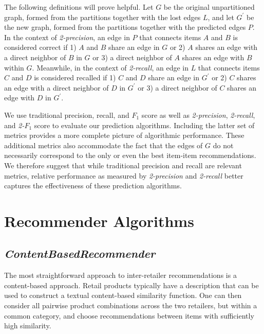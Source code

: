 \documentclass[11pt]{article}
\begin{document}
The following definitions will prove helpful. Let $G$ be the original
unpartitioned graph, formed from the partitions together with the lost edges
$L$, and let $G^{\prime}$ be the new graph, formed from the partitions together
with the predicted edges $P$.  In the context of {\em 2-precision}, an edge in
$P$ that connects items $A$ and $B$ is considered correct if 1) $A$ and $B$
share an edge in $G$ or 2) $A$ shares an edge with a direct neighbor of $B$ in
$G$ or 3) a direct neighbor of $A$ shares an edge with $B$ within $G$.
Meanwhile, in the context of {\em 2-recall}, an edge in $L$ that connects items
$C$ and $D$ is considered recalled if 1) $C$ and $D$ share an edge in
$G^{\prime}$ or 2) $C$ shares an edge with a direct neighbor of $D$ in
$G^{\prime}$ or 3) a direct neighbor of $C$ shares an edge with $D$ in
$G^{\prime}$.

We use traditional precision, recall, and $F_1$ score as well as {\em
2-precision}, {\em 2-recall}, and {\em 2-}$F_1$ score to evaluate our prediction
algorithms. Including the latter set of metrics provides a more complete picture
of algorithmic performance. These additional metrics also accommodate the fact
that the edges of $G$ do not necessarily correspond to the only or even the best
item-item recommendations. We therefore suggest that while traditional precision
and recall are relevant metrics, relative performance as measured by {\em
2-precision} and {\em 2-recall} better captures the effectiveness of these
prediction algorithms.

\section*{Recommender Algorithms}

\subsection*{\em ContentBasedRecommender}
The most straightforward approach to inter-retailer recommendations is a
content-based approach. Retail products typically have a description that can be
used to construct a textual content-based similarity function. One can then
consider all pairwise product combinations across the two retailers, but within
a common category, and choose recommendations between items with sufficiently
high similarity.
\end{document}
